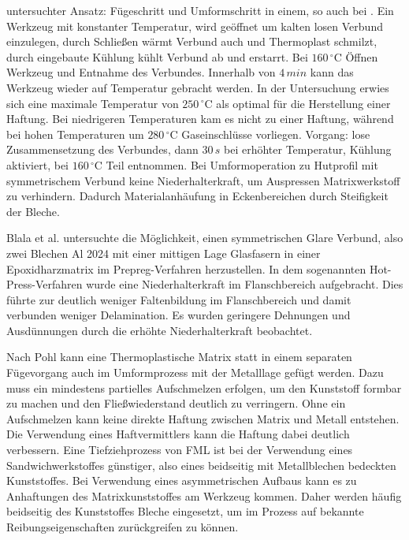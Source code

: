 untersuchter Ansatz: Fügeschritt und Umformschritt in einem, so auch bei \cite{BerndArno.2017}.
Ein Werkzeug mit konstanter Temperatur, wird geöffnet um kalten losen Verbund einzulegen, durch Schließen wärmt Verbund auch und Thermoplast schmilzt, durch eingebaute Kühlung kühlt Verbund ab und erstarrt. Bei $160 \, ^\circ \text{C}$ Öffnen Werkzeug und Entnahme des Verbundes.
Innerhalb von $4\, min$ kann das Werkzeug wieder auf Temperatur gebracht werden.
In der Untersuchung erwies sich eine maximale Temperatur von $250 \, ^\circ \text{C}$ als optimal für die Herstellung einer Haftung.
Bei niedrigeren Temperaturen kam es nicht zu einer Haftung, während bei hohen Temperaturen um $280 \, ^\circ \text{C}$ Gaseinschlüsse vorliegen.
Vorgang: lose Zusammensetzung des Verbundes, dann $30 \, s$ bei erhöhter Temperatur, Kühlung aktiviert, bei $160 \, ^\circ \text{C}$ Teil entnommen.
Bei Umformoperation zu Hutprofil mit symmetrischem Verbund keine Niederhalterkraft, um Auspressen Matrixwerkstoff zu verhindern.
Dadurch Materialanhäufung in Eckenbereichen durch Steifigkeit der Bleche.

Blala et al. \cite{Blala.2021} untersuchte die Möglichkeit, einen symmetrischen Glare Verbund, also zwei Blechen Al 2024 mit einer mittigen Lage Glasfasern in einer Epoxidharzmatrix im Prepreg-Verfahren herzustellen. In dem sogenannten Hot-Press-Verfahren wurde eine Niederhalterkraft im Flanschbereich aufgebracht. Dies führte zur deutlich weniger Faltenbildung im Flanschbereich und damit verbunden weniger Delamination. Es wurden geringere Dehnungen und Ausdünnungen durch die erhöhte Niederhalterkraft beobachtet.

Nach Pohl \cite{Pohl.2000} kann eine Thermoplastische Matrix statt in einem separaten Fügevorgang auch im Umformprozess mit der Metalllage gefügt werden.
Dazu muss ein mindestens partielles Aufschmelzen erfolgen, um den Kunststoff formbar zu machen und den Fließwiederstand deutlich zu verringern.
Ohne ein Aufschmelzen kann keine direkte Haftung zwischen Matrix und Metall entstehen.
Die Verwendung eines Haftvermittlers kann die Haftung dabei deutlich verbessern.
Eine Tiefziehprozess von FML ist bei der Verwendung eines Sandwichwerkstoffes günstiger, also eines beidseitig mit Metallblechen bedeckten Kunststoffes.
Bei Verwendung eines asymmetrischen Aufbaus kann es zu Anhaftungen des Matrixkunststoffes am Werkzeug kommen.
Daher werden häufig beidseitig des Kunststoffes Bleche eingesetzt, um im Prozess auf bekannte Reibungseigenschaften zurückgreifen zu können. \cite{Behrens.2014}




